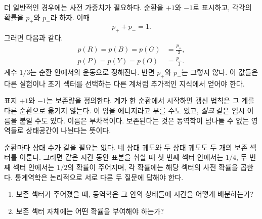 더 일반적인 경우에는 사전 가중치가 필요하다. 순환을 \(+1\)와 \(-1\)로 표시하고, 각각의 확률을 \(p_+\)와 \(p_-\)라 하자. 이때
\begin{equation}
 p_++p_-=1.
\end{equation}
그러면 다음과 같다.
\begin{align}
 p(R)=p(B)=p(G)&=\frac{p_+}{3},\\
 p(P)=p(Y)=p(O)&=\frac{p_-}{3}.
 \label{eq:sm1-sector-weights}
\end{align}
계수 \(1/3\)는 순환 안에서의 운동으로 정해진다. 반면 \(p_+\)와 \(p_-\)는 그렇지 않다. 이 값들은 다른 실험이나 초기 섹터를 선택하는 다른 계처럼 추가적인 지식에서 얻어야 한다.

표지 \(+1\)와 \(-1\)는 보존량을 정의한다. 계가 한 순환에서 시작하면 갱신 법칙은 그 계를 다른 순환으로 옮기지 않는다. 이 양을 에너지라고 부를 수도 있고, \emph{질크} 같은 임시 이름을 붙일 수도 있다. 이름은 부차적이다. 보존된다는 것은 동역학이 넘나들 수 없는 영역들로 상태공간이 나뉜다는 뜻이다.

순환마다 상태 수가 같을 필요는 없다. 네 상태 궤도와 두 상태 궤도도 두 개의 보존 섹터를 이룬다. 그러면 같은 시간 동안 표본을 취할 때 첫 번째 섹터 안에서는 \(1/4\), 두 번째 섹터 안에서는 \(1/2\)의 확률이 주어지며, 각 확률에는 해당 섹터의 사전 확률을 곱한다. 통계역학은 논리적으로 서로 다른 두 질문에 답해야 한다.
\begin{enumerate}
\item 보존 섹터가 주어졌을 때, 동역학은 그 안의 상태들에 시간을 어떻게 배분하는가?
\item 보존 섹터 자체에는 어떤 확률을 부여해야 하는가?
\end{enumerate}

\begin{classroomqa}
\end{classroomqa}

\begin{classroomqa}
\end{classroomqa}

